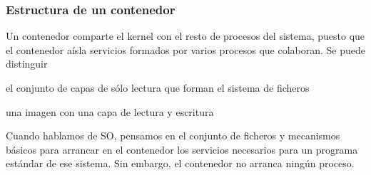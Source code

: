 \documentclass[xcolor=dvipsnames]{beamer}
\begin{document}
\begin{frame}[fragile]
	\frametitle{Estructura de un contenedor}

	Un contenedor comparte el kernel con el resto de procesos del sistema, puesto que el contenedor aísla servicios formados por varios procesos que colaboran. Se puede distinguir 
	\begin{description}[contenedor]
		\item [imagen] el conjunto de capas de sólo lectura que forman el sistema de ficheros
		\item [contenedor] una imagen con una capa de lectura y escritura
	\end{description}

	Cuando hablamos de SO, pensamos en el conjunto de ficheros y mecanismos básicos para arrancar en el contenedor los servicios necesarios para un programa estándar de ese sistema. Sin embargo, el contenedor no arranca ningún proceso.

\end{frame}
\end{document}
